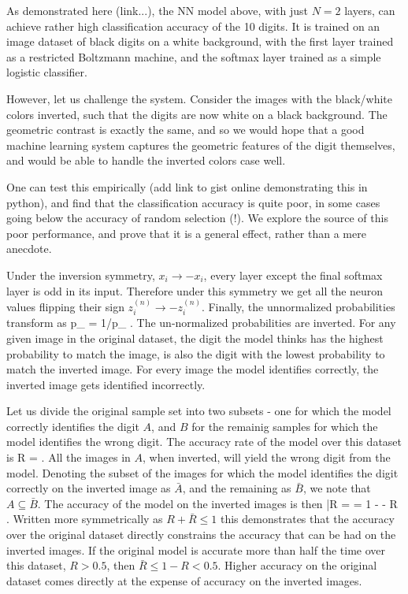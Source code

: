 \documentclass[twocolumn, prl]{revtex4-1}
\begin{document}
As demonstrated here (link...), the NN model above, with just $N=2$ layers, can achieve rather high classification accuracy of the 10 digits.
It is trained on an image dataset of black digits on a white background, with the first layer trained as a restricted Boltzmann machine, and the softmax layer trained as a simple logistic classifier.

However, let us challenge the system. Consider the images with the black/white colors inverted, such that the digits are now white on 
a black background. The geometric contrast is exactly the same, and so we would hope that a good machine learning system captures the geometric features of the digit themselves, and would be able to handle the inverted colors case well.

One can test this empirically (add link to gist online demonstrating this in python), and find that the classification accuracy is quite poor, in some cases going below the accuracy of random selection (!). We explore the source of this poor performance, and prove that it is a general effect, rather than a mere anecdote.

Under the inversion symmetry, $x_i \rightarrow - x_i$, every layer except the final softmax layer is odd in its 
input. Therefore under this symmetry we get all the neuron values flipping their sign $z^{(n)}_i \rightarrow - z^{(n)}_i$. Finally, the unnormalized probabilities transform as
\be
{\tilde p}_{\alpha} \rightarrow \exp{} = 1/{\tilde p}_{\alpha}
\; .
\ee
The un-normalized probabilities are inverted. For any given image in the original dataset, the digit the model thinks has the highest probability to match the image, is also the digit with the lowest probability to match the inverted image. For every image the model identifies correctly, the inverted image
gets identified incorrectly.

Let us divide the original sample set into two subsets - one for which the model correctly identifies the digit $A$, and $B$ for the remainig samples for which the model identifies the wrong digit. The accuracy rate of the model over this dataset is 
\be
R = 
\; .
\ee
All the images in $A$, when inverted, will yield the wrong digit from the model. Denoting the subset of the images for which the model identifies the digit correctly on the inverted image as ${\bar A}$, and the remaining as ${\bar B}$, we note that $A \subseteq {\bar B}$. The accuracy of the model on the inverted images is then
\be
{\bar R} =  = 1 -   - R
\; .
\ee
Written more symmetrically as $R + {\bar R} \leq 1$ this demonstrates that the accuracy over the original dataset directly constrains the accuracy that can be had on the inverted images. If the original model is accurate more than half the time over this dataset, $R>0.5$, then ${\bar R} \leq 1 - R < 0.5$. Higher accuracy on the original dataset comes directly at the expense of accuracy on the inverted images. 
\end{document}
